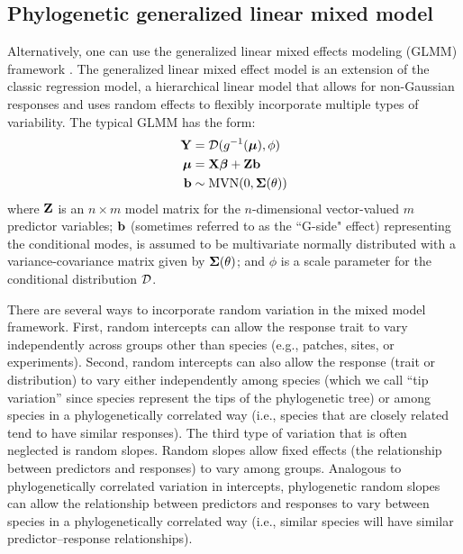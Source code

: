 \documentclass[12pt]{article}
\begin{document}
\subsection*{Phylogenetic generalized linear mixed model}
Alternatively, one can use the generalized linear mixed effects modeling (GLMM) framework \citep{lynch1991methods}.
The generalized linear mixed effect model is an extension of the classic regression model, a hierarchical linear model that  allows for non-Gaussian responses and uses random effects to flexibly incorporate multiple types of variability.
The typical GLMM has the form:
\newcommand{\dist}{{\cal D}}
\begin{equation}
\begin{aligned}
\bY & = \dist(g^{-1}(\bmu), \phi) \\
\bmu & = \bX \bbeta + \bZ \bb  \\
\bb & \sim \textrm{MVN}(0, \bSigma(\theta))  \\
\label{eq:glmm}
\end{aligned}
\end{equation}
where ${\mathbf Z}$ is an $n \times m$ model matrix for the $n$-dimensional vector-valued $m$ predictor variables; ${\mathbf b}$ (sometimes referred to as the ``G-side" effect) representing the conditional modes, is assumed to be multivariate normally distributed with a variance-covariance matrix given by ${\boldsymbol \Sigma}(\theta)$; and $\phi$ is a scale parameter for the conditional distribution $\dist$.

There are several ways to incorporate random variation in the mixed model framework.
First, random intercepts can allow the response trait to vary independently across groups other than species (e.g., patches, sites, or experiments). 
Second, random intercepts can also allow the response (trait or distribution) to vary either independently among species (which we call ``tip variation'' since species represent the tips of the phylogenetic tree) or among species in a phylogenetically correlated way (i.e., species that are closely related tend to have similar responses).
The third type of variation that is often neglected is random slopes.
Random slopes allow fixed effects (the relationship between predictors and responses) to vary among groups.
Analogous to phylogenetically correlated variation in intercepts, phylogenetic random slopes can allow the relationship between predictors and responses to vary between species in a phylogenetically correlated way (i.e., similar species will have similar predictor--response relationships).
\end{document}
